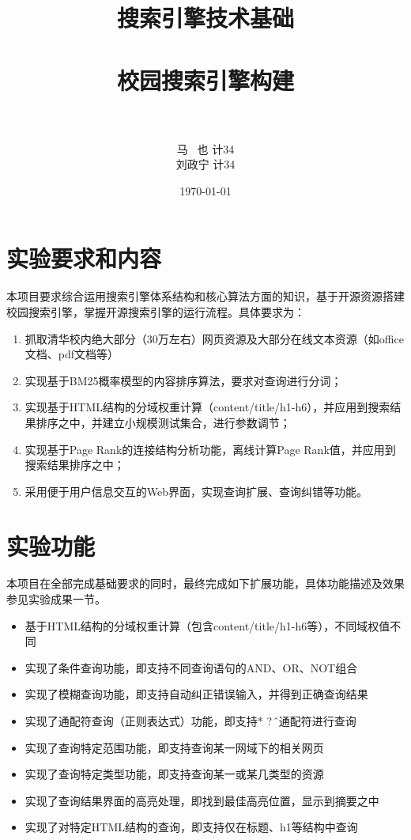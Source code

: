 \documentclass[paper=a4, fontsize=11pt, UTF8]{article} %
\title{
\normalfont \normalsize
\textsc{\kaishu 搜索引擎技术基础} \\ [5pt] %
\horrule{0.5pt} \\[0.4cm] %
\huge 校园搜索引擎构建 \\ %
\horrule{2pt} \\[0.5cm] %
}
\author{马\; \, 也 \quad 2013011365 计34 \\ 刘政宁 \quad 2013011362 计34}
\date{\normalsize\today} %
\numberwithin{equation}{section} %
\numberwithin{figure}{section} %
\numberwithin{table}{section} %
\begin{document}
\maketitle %

\thispagestyle{empty}
\newpage

\setcounter{page}{1}
\fontsize{10pt}{15pt}\selectfont

\section{实验要求和内容}

本项目要求综合运用搜索引擎体系结构和核心算法方面的知识，基于开源资源搭建校园搜索引擎，掌握开源搜索引擎的运行流程。具体要求为：

\begin{enumerate}
\item 抓取清华校内绝大部分（30万左右）网页资源及大部分在线文本资源（如office文档、pdf文档等）
\item 实现基于BM25概率模型的内容排序算法，要求对查询进行分词；
\item 实现基于HTML结构的分域权重计算（content/title/h1-h6），并应用到搜索结果排序之中，并建立小规模测试集合，进行参数调节；
\item 实现基于Page Rank的连接结构分析功能，离线计算Page Rank值，并应用到搜索结果排序之中；
\item 采用便于用户信息交互的Web界面，实现查询扩展、查询纠错等功能。
\end{enumerate}


\section{实验功能}

本项目在全部完成基础要求的同时，最终完成如下扩展功能，具体功能描述及效果参见实验成果一节。

\begin{itemize}
\item 基于HTML结构的分域权重计算（包含content/title/h1-h6等），不同域权值不同
\item 实现了条件查询功能，即支持不同查询语句的AND、OR、NOT组合
\item 实现了模糊查询功能，即支持自动纠正错误输入，并得到正确查询结果
\item 实现了通配符查询（正则表达式）功能，即支持* ? \^  等通配符进行查询
\item 实现了查询特定范围功能，即支持查询某一网域下的相关网页
\item 实现了查询特定类型功能，即支持查询某一或某几类型的资源
\item 实现了查询结果界面的高亮处理，即找到最佳高亮位置，显示到摘要之中
\item 实现了对特定HTML结构的查询，即支持仅在标题、h1等结构中查询
\end{itemize}
\end{document}
